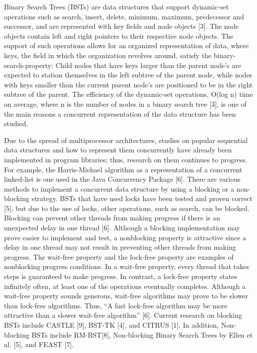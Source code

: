 \documentclass[conference]{IEEEtran}
\begin{document}
Binary Search Trees (BSTs) are data structures that support dynamic-set operations such as search, insert, delete, minimum, maximum, predecessor and successor, and are represented with key fields and node objects [3]. The node objects contain left and right pointers to their respective node objects. The support of such operations allows for an organized representation of data, where keys, the field in which the organization revolves around, satisfy the binary-search-property: Child nodes that have keys larger than the parent node’s are expected to station themselves in the left subtree of the parent node, while nodes with keys smaller than the current parent node’s are positioned to be in the right subtree of the parent. The efficiency of the dynamic-set operations, O(log n) time on average, where n is the number of nodes in a binary search tree [3], is one of the main reasons a concurrent representation of the data structure has been studied.

Due to the spread of multiprocessor architectures, studies on popular sequential data structures and how to represent them concurrently have already been implemented in program libraries; thus, research on them continues to progress. For example, the Harris-Michael algorithm as a representation of a concurrent linked-list is one used in the Java Concurrency Package [6]. There are various methods to implement a concurrent data structure by using a blocking or a non-blocking strategy. BSTs that have used locks have been tested and proven correct [5], but due to the use of locks, other operations, such as search, can be blocked. Blocking can prevent other threads from making progress if there is an unexpected delay in one thread [6]. Although a blocking implementation may prove easier to implement and test, a nonblocking property is attractive since a delay in one thread may not result in preventing other threads from making progress. The wait-free property and the lock-free property are examples of nonblocking progress conditions. In a wait-free property, every thread that takes steps is guaranteed to make progress. In contrast, a lock-free property states infinitely often, at least one of the operations eventually completes. Although a wait-free property sounds generous, wait-free algorithms may prove to be slower than lock-free algorithms. Thus, “A fast lock-free algorithm may be more attractive than a slower wait-free algorithm” [6]. Current research on blocking BSTs include CASTLE [9], BST-TK [4], and CITRUS [1]. In addition, Non-blocking BSTs include RM-BST[8], Non-blocking Binary Search Trees by Ellen et al. [5], and FEAST [7]. 
\end{document}
